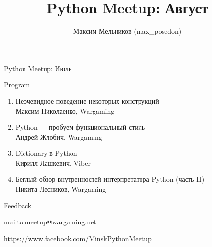\documentclass[aspectratio=169]{beamer}
\begin{document}
\title{Python Meetup: Август}
\author{Максим Мельников (max\_posedon)}
\date{}

\begin{frame}{Python Meetup: Июль}
    \begin{block}{Program}
    \begin{enumerate}
        \item Неочевидное поведение некоторых конструкций\\Максим Николаенко, Wargaming
        \item Python --- пробуем функциональный стиль\\Андрей Жлобич, Wargaming
        \item Dictionary в Python\\Кирилл Лашкевич, Viber
        \item Беглый обзор внутренностей интерпретатора Python (часть II)\\Никита Лесников, Wargaming
    \end{enumerate}
    \end{block}

    \begin{block}{Feedback}
    \par \url{mailto:meetup@wargaming.net}
    \par \url{https://www.facebook.com/MinskPythonMeetup}
    \end{block}
\end{frame}
\end{document}
